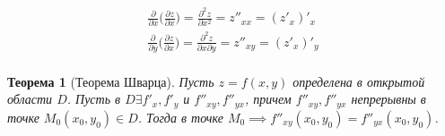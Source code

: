 \documentclass[a4paper,12pt,oneside]{extbook}
\theoremstyle{numbered}
\theoremstyle{unnumbered}
\theoremstyle{named}
\newtheorem{theorem}{Теорема}[section]
\theoremstyle{unnumbered}
\theoremstyle{named}
\theoremstyle{named}
\theoremstyle{named}
\begin{document}
\begin{gather*}
    \frac{\partial}{\partial x} \Big(\frac{\partial z}{\partial x}\Big) = \frac{\partial^2 z}{\partial x^2} = z''_{xx} = (z'_x)'_x \\
    \frac{\partial}{\partial y} \Big(\frac{\partial z}{\partial x}\Big) = \frac{\partial^2 z}{\partial x \partial y} = z''_{xy} = (z'_x)'_y \\
\end{gather*}

\begin{theorem}[Теорема Шварца]
    Пусть \(z = f(x, y)\) определена в открытой области \(D\). Пусть в \(D \exists f'_x, f'_y\) и \(f''_{xy}, f''_{yx}\), причем \(f''_{xy}, f''_{yx}\) непрерывны в точке \(M_0(x_0, y_0) \in D\). Тогда в точке \(M_0 \implies f''_{xy}(x_0, y_0) = f''_{yx}(x_0, y_0)\).
\end{theorem}
\end{document}
